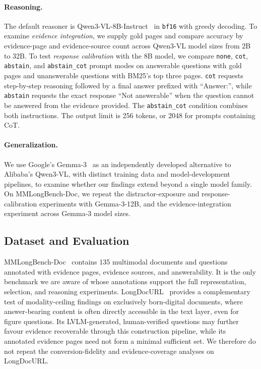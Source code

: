 \documentclass[11pt]{article}
\begin{document}
\paragraph{Reasoning.}
The default reasoner is Qwen3-VL-8B-Instruct~\citep{team2025qwen3} in \texttt{bf16} with greedy decoding. To examine \textit{evidence integration}, we supply gold pages and compare accuracy by evidence-page and evidence-source count across Qwen3-VL model sizes from 2B to 32B. To test \textit{response calibration} with the 8B model, we compare \texttt{none}, \texttt{cot}, \texttt{abstain}, and \texttt{abstain\_cot} prompt modes on answerable questions with gold pages and unanswerable questions with BM25's top three pages. \texttt{cot} requests step-by-step reasoning followed by a final answer prefixed with ``Answer:'', while \texttt{abstain} requests the exact response ``Not answerable'' when the question cannot be answered from the evidence provided. The \texttt{abstain\_cot} condition combines both instructions. The output limit is 256 tokens, or 2048 for prompts containing CoT.

\paragraph{Generalization.}
We use Google's Gemma-3~\cite{team2025gemma} as an independently developed alternative to Alibaba's Qwen3-VL, with distinct training data and model-development pipelines, to examine whether our findings extend beyond a single model family. On MMLongBench-Doc, we repeat the distractor-exposure and response-calibration experiments with Gemma-3-12B, and the evidence-integration experiment across Gemma-3 model sizes. 

% 

\subsection{Dataset and Evaluation}
\label{sec:dataset_evaluation}

MMLongBench-Doc~\citep{ma2024mmlongbench} contains 135 multimodal documents and questions annotated with evidence pages, evidence sources, and answerability. It is the only benchmark we are aware of whose annotations support the full representation, selection, and reasoning experiments. LongDocURL~\citep{deng2025longdocurl} provides a complementary test of modality-ceiling findings on exclusively born-digital documents, where answer-bearing content is often directly accessible in the text layer, even for figure questions. Its LVLM-generated, human-verified questions may further favour evidence recoverable through this construction pipeline, while its annotated evidence pages need not form a minimal sufficient set. We therefore do not repeat the conversion-fidelity and evidence-coverage analyses on LongDocURL.
\end{document}
